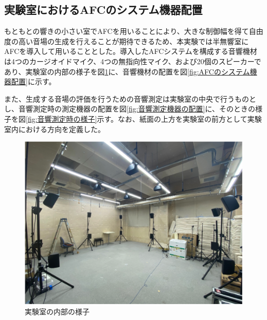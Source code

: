 \documentclass[11pt,a4j]{jreport}
\begin{document}

\newpage
\subsection{実験室におけるAFCのシステム機器配置}
もともとの響きの小さい室でAFCを用いることにより、大きな制御幅を得て自由度の高い音場の生成を行えることが期待できるため、本実験では半無響室にAFCを導入して用いることとした。導入したAFCシステムを構成する音響機材は4つのカージオイドマイク、4つの無指向性マイク、および20個のスピーカーであり、実験室の内部の様子を図\ref{fig:実験室の内部の様子}に、音響機材の配置を図\ref{fig:AFCのシステム機器配置}に示す。

また、生成する音場の評価を行うための音響測定は実験室の中央で行うものとし、音響測定時の測定機器の配置を図\ref{fig:音響測定機器の配置}に、そのときの様子を図\ref{fig:音響測定時の様子}示す。なお、紙面の上方を実験室の前方として実験室内における方向を定義した。

\begin{figure}[H]
  \centering
  \includegraphics[width=0.6\linewidth]{images/twoPiRoom/twoPiRoomPhoto.png}
  \caption{実験室の内部の様子}
  \label{fig:実験室の内部の様子}
\end{figure}
\end{document}
